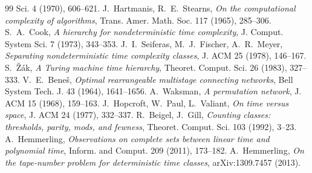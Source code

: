 \documentclass[11pt]{article}
\theoremstyle{definition}
\theoremstyle{remark}
\begin{document}
\begin{thebibliography}{99}
  Sci. 4 (1970), 606--621.
 J.~Hartmanis, R.~E.~Stearns, \emph{On the computational complexity of algorithms}, Trans. Amer. Math. Soc. 117
  (1965), 285--306.
 S.~A.~Cook, \emph{A hierarchy for nondeterministic time complexity}, J. Comput. System Sci. 7 (1973), 343--353.
 J.~I.~Seiferas, M.~J.~Fischer, A.~R.~Meyer, \emph{Separating nondeterministic time complexity classes}, J. ACM 25
  (1978), 146--167.
 S.~\v{Z}\'ak, \emph{A Turing machine time hierarchy}, Theoret. Comput. Sci. 26 (1983), 327--333.
 V.~E.~Bene\v{s}, \emph{Optimal rearrangeable multistage connecting networks}, Bell System Tech. J. 43 (1964),
  1641--1656.
 A.~Waksman, \emph{A permutation network}, J. ACM 15 (1968), 159--163.
 J.~Hopcroft, W.~Paul, L.~Valiant, \emph{On time versus space}, J. ACM 24 (1977), 332--337.
 R.~Beigel, J.~Gill, \emph{Counting classes: thresholds, parity, mods, and fewness}, Theoret. Comput. Sci. 103 (1992),
  3--23.
 A.~Hemmerling, \emph{Observations on complete sets between linear time and polynomial time}, Inform. and Comput. 209
  (2011), 173--182.
 A.~Hemmerling, \emph{On the tape-number problem for deterministic time classes}, arXiv:1309.7457 (2013).
\end{thebibliography}
\end{document}

